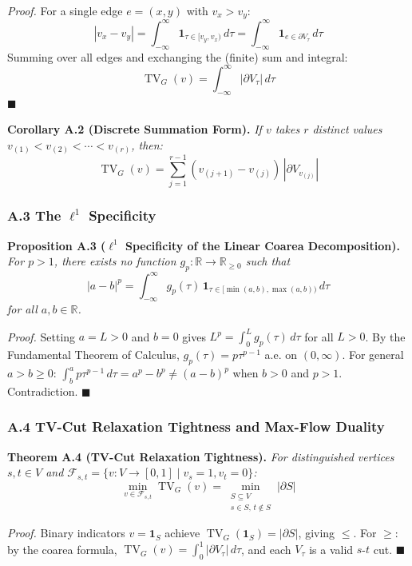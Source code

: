 \documentclass[
]{article}
\begin{document}
\emph{Proof.} For a single edge \(e = (x,y)\) with \(v_x > v_y\):
\[ |v_x - v_y| = \int_{-\infty}^{\infty} \mathbf{1}_{\tau \in [v_y, v_x)} \, d\tau = \int_{-\infty}^{\infty} \mathbf{1}_{e \in \partial V_\tau} \, d\tau \]
Summing over all edges and exchanging the (finite) sum and integral:
\[ \operatorname{TV}_G(v) = \int_{-\infty}^{\infty} |\partial V_\tau| \, d\tau \]
\(\blacksquare\)

\textbf{Corollary A.2 (Discrete Summation Form).} \emph{If \(v\) takes
\(r\) distinct values \(v_{(1)} < v_{(2)} < \cdots < v_{(r)}\), then:}
\[ \operatorname{TV}_G(v) = \sum_{j=1}^{r-1} (v_{(j+1)} - v_{(j)}) \, |\partial V_{v_{(j)}}| \]

\subsubsection{\texorpdfstring{A.3 The \(\ell^1\)
Specificity}{A.3 The \textbackslash ell\^{}1 Specificity}}\label{a.3-the-ell1-specificity}

\textbf{Proposition A.3 (\(\ell^1\) Specificity of the Linear Coarea
Decomposition).} \emph{For \(p > 1\), there exists no function
\(g_p : \mathbb{R} \to \mathbb{R}_{\geq 0}\) such that}
\[ |a - b|^p = \int_{-\infty}^{\infty} g_p(\tau) \, \mathbf{1}_{\tau \in [\min(a,b), \max(a,b))} \, d\tau \]
\emph{for all \(a, b \in \mathbb{R}\).}

\emph{Proof.} Setting \(a = L > 0\) and \(b = 0\) gives
\(L^p = \int_0^L g_p(\tau) \, d\tau\) for all \(L > 0\). By the
Fundamental Theorem of Calculus, \(g_p(\tau) = p \tau^{p-1}\) a.e. on
\((0, \infty)\). For general \(a > b \geq 0\):
\(\int_b^a p \tau^{p-1} \, d\tau = a^p - b^p \neq (a - b)^p\) when
\(b > 0\) and \(p > 1\). Contradiction. \(\blacksquare\)

\subsubsection{A.4 TV-Cut Relaxation Tightness and Max-Flow
Duality}\label{a.4-tv-cut-relaxation-tightness-and-max-flow-duality}

\textbf{Theorem A.4 (TV-Cut Relaxation Tightness).} \emph{For
distinguished vertices \(s, t \in V\) and
\(\mathcal{F}_{s,t} = \{ v : V \to [0,1] \mid v_s = 1, v_t = 0 \}\):}
\[ \min_{v \in \mathcal{F}_{s,t}} \operatorname{TV}_G(v) = \min_{\substack{S \subseteq V \\ s \in S, \, t \notin S}} |\partial S| \]

\emph{Proof.} Binary indicators \(v = \mathbf{1}_S\) achieve
\(\operatorname{TV}_G(\mathbf{1}_S) = |\partial S|\), giving \(\leq\).
For \(\geq\): by the coarea formula,
\(\operatorname{TV}_G(v) = \int_0^1 |\partial V_\tau| \, d\tau\), and
each \(V_\tau\) is a valid \(s\)-\(t\) cut. \(\blacksquare\)
\end{document}
